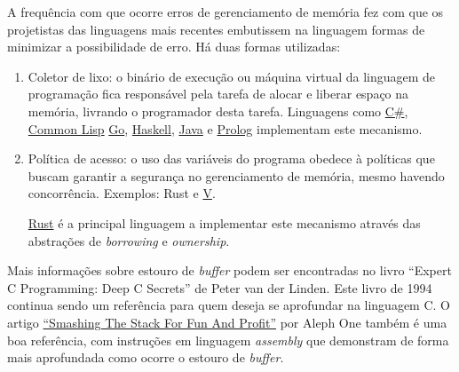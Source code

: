 \begin{frame}[fragile]{}\small

A frequência com que ocorre erros de gerenciamento de memória fez com
que os projetistas das linguagens mais recentes embutissem na
linguagem formas de minimizar a possibilidade de erro. Há duas
formas utilizadas:

\begin{enumerate}
\item Coletor de lixo: o binário de execução ou máquina virtual da
linguagem de programação fica responsável pela tarefa de alocar e
liberar espaço na memória, livrando o programador desta tarefa. Linguagens
como
 \href{https://docs.microsoft.com/pt-br/dotnet/csharp/programming-guide/}{C\#},
 \href{http://lisp-lang.org/}{Common Lisp}
 \href{https://golang.org/}{Go}, \href{https://www.haskell.org/}{Haskell},
 \href{https://www.java.com/en/}{Java} e \href{http://www.swi-prolog.org/}{Prolog}
 implementam este mecanismo.
 \pause
\item Política de acesso: o uso das variáveis do programa obedece à
   políticas que buscam garantir a segurança no gerenciamento
   de memória, mesmo havendo concorrência. Exemplos: Rust e 
   \href{https://vlang.io/}{V}.
   
   \href{https://www.rust-lang.org/pt-BR/}{Rust} é a principal linguagem
   a implementar este mecanismo através das abstrações de {\it borrowing\/}
   e {\it ownership\/}.
\end{enumerate}

\end{frame}

\begin{frame}{}

Mais informações sobre estouro de {\it buffer} podem ser encontradas
no livro ``Expert C Programming: Deep C Secrets'' de Peter van der
Linden. Este livro de 1994 continua sendo um referência para quem
deseja se aprofundar na linguagem C. O artigo
\href{http://insecure.org/stf/smashstack.html}{``Smashing The Stack For Fun And Profit''}
por Aleph One também é uma boa referência, com instruções em linguagem
{\it assembly\/} que demonstram de forma mais aprofundada como ocorre o
estouro de {\it buffer\/}.

\end{frame}


